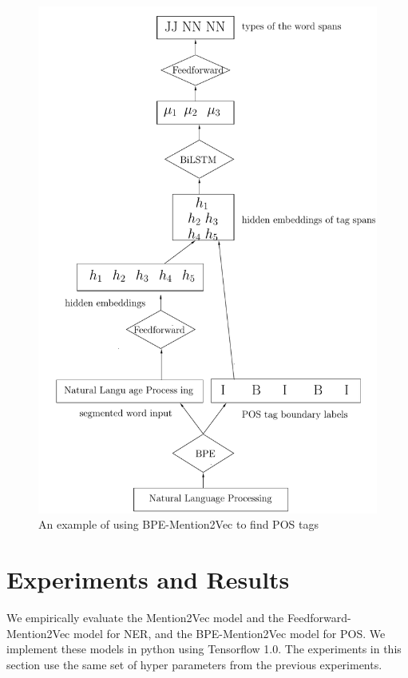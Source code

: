 \documentclass{sfuthesis}
\begin{document}
\begin{figure}
  \centering
  \includegraphics[scale=0.5]{bpemention2vec.pdf}
 \caption{An example of using BPE-Mention2Vec to find POS tags}
  \label{fig:bpemention2vec}
\end{figure}

\section{Experiments and Results}

We empirically evaluate the Mention2Vec model and the Feedforward-Mention2Vec model for NER, and the BPE-Mention2Vec model for POS. We implement these models in python using Tensorflow 1.0. The experiments in this section use the same set of hyper parameters from the previous experiments. 
\end{document}
